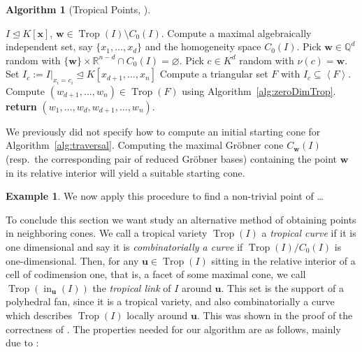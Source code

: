 \documentclass[
  paper=a4,
  titlepage,
  bibliography=totoc,
  listof=totoc,
  pagesize=pdftex
]{scrartcl}
\numberwithin{figure}{section}
\numberwithin{equation}{section}
\numberwithin{table}{section}
\newcommand*\setR{\mathds{R}}
\newcommand*\setQ{\mathds{Q}}
\newcommand*\setT{\mathds{T}}
\newcommand*\ideal[1]{\left\langle #1 \right\rangle}
\let\vec\mathbf
\let\idealof\trianglelefteq
\DeclareMathOperator{\Trop}{Trop}
\DeclareMathOperator{\initial}{in}
\theoremstyle{definition}
\newtheorem{example}[definition]{Example}
\newtheorem{algo}[definition]{Algorithm}
\numberwithin{definition}{section}
\begin{document}
\begin{algo}[Tropical Points, {\cite[Algorithm~3.3]{tropPointsLinks}}]\
  \begin{algorithmic}[1]
    \Require $I \idealof K[\vec x]$,
    \Ensure $\vec w \in \Trop(I) \setminus C_0(I)$.
    \State Compute a maximal algebraically independent set, say $\{x_1, \dots, x_d\}$ and
    the homogeneity space $C_0(I)$.
    \Repeat
      \State Pick $\vec w \in \setQ^d$ random with $\{\vec w\} \times \setR^{n-d} \cap
        C_0(I) = \varnothing$.
      \State Pick $c \in K^d$ random with $\nu(c) = \vec w$.
      \State Set $I_c := I|_{x_i = c_i} \idealof K[x_{d+1}, \dots, x_n]$
    \Until{$\dim(I_c) = 0$ and $V(I_c) \subseteq \setT^{n-d}$}
    \State Compute a triangular set $F$ with $I_c \subseteq \ideal F$.
    \State Compute $(w_{d+1}, \dots, w_n) \in \Trop(F)$ using
      Algorithm~\ref{alg:zeroDimTrop}.
    \State\textbf{return} $(w_1, \dots, w_d, w_{d+1}, \dots, w_n)$.
  \end{algorithmic}
  \label{alg:tropicalPoint}
\end{algo}

We previously did not specify how to compute an initial starting cone for
Algorithm~\ref{alg:traversal}. Computing the maximal Gröbner cone $C_{\vec w}(I)$ (resp.\
the corresponding pair of reduced Gröbner bases) containing the point $\vec w$ in its
relative interior will yield a suitable starting cone.

\begin{example}
  We now apply this procedure to find a non-trivial point of \dots%
\end{example}

To conclude this section we want study an alternative method of obtaining points in
neighboring cones. We call a tropical variety $\Trop(I)$ a \emph{tropical curve} if it is
one dimensional and say it is \emph{combinatorially a curve} if $\Trop(I)/C_0(I)$ is
one-dimensional. Then, for any $\vec u \in \Trop(I)$ sitting in the relative interior of a
cell of codimension one, that is, a facet of some maximal cone, we call
$\Trop(\initial_{\vec u}(I))$ the \emph{tropical link} of $I$ around $\vec u$. This set is
the support of a polyhedral fan, since it is a tropical variety, and also combinatorially
a curve which describes $\Trop(I)$ locally around $\vec u$. This was shown in the proof of
the correctness of \cite[Algorithm~4.10]{compTropVar}. The properties needed for our
algorithm are as follows, mainly due to \cite{ossTropLift}:
\end{document}

